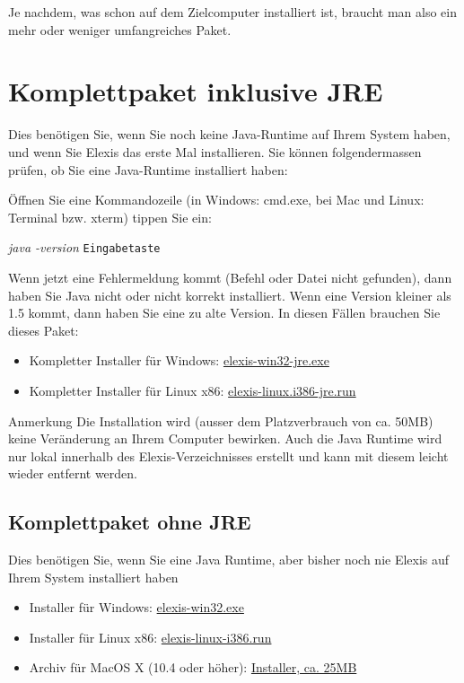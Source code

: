 Je nachdem, was schon auf dem Zielcomputer installiert ist, braucht man also ein mehr oder weniger umfangreiches Paket.

\section{Komplettpaket inklusive JRE}

Dies benötigen Sie, wenn Sie noch keine Java-Runtime auf Ihrem System haben, und wenn Sie Elexis das erste Mal installieren. Sie können folgendermassen prüfen, ob Sie eine Java-Runtime installiert haben:

Öffnen Sie eine Kommandozeile (in Windows: cmd.exe, bei Mac und Linux: Terminal bzw. xterm) tippen Sie ein:

\textit{java -version} \texttt{Eingabetaste}

Wenn jetzt eine Fehlermeldung kommt (Befehl oder Datei nicht gefunden), dann haben Sie Java nicht oder nicht korrekt installiert. Wenn eine Version kleiner als 1.5 kommt, dann haben Sie eine zu alte Version. In diesen Fällen brauchen Sie dieses Paket:
\begin{itemize}
 \item Kompletter Installer für Windows:  \href{http://www.elexis.ch/download.php?file=demo} {elexis-win32-jre.exe}
\item Kompletter Installer für Linux x86:  \href{http://www.elexis.ch/download.php?file=elexis-linux-jre-i386}{elexis-linux.i386-jre.run}


\end{itemize}


Anmerkung
Die Installation wird (ausser dem Platzverbrauch von ca. 50MB) keine Veränderung an Ihrem Computer bewirken. Auch die Java Runtime wird nur lokal innerhalb des Elexis-Verzeichnisses erstellt und kann mit diesem leicht wieder entfernt werden.
%
%
\subsection{Komplettpaket ohne JRE}
Dies benötigen Sie, wenn Sie eine Java Runtime, aber bisher noch nie Elexis auf Ihrem System installiert haben
\begin{itemize}
 \item Installer für Windows:  \href{http://www.rgw.ch/download.php?file=elexis-win32}{elexis-win32.exe}
\item Installer für Linux x86:  \href{http://www.elexis.ch/download.php?file=elexis-linux-i386}{elexis-linux-i386.run}
\item Archiv für MacOS X (10.4 oder höher): \href{http://www.elexis.ch/download.php?file=elexis-mac}{Installer, ca. 25MB}
\end{itemize}


